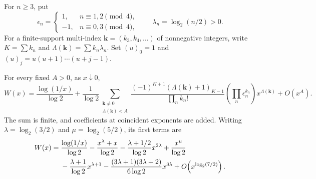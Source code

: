 For $n\ge3$, put
\begin{equation}\label{eq:lambdas}
 \epsilon_n=
 \begin{cases}1,&n\equiv1,2\pmod4,\\-1,&n\equiv0,3\pmod4,
 \end{cases}
 \qquad \lambda_n=\log_2(n/2)>0.
\end{equation}
For a finite-support multi-index $\mathbf k=(k_3,k_4,\ldots)$ of
nonnegative integers, write $K=\sum k_n$ and
$\Lambda(\mathbf k)=\sum k_n\lambda_n$. Set $(u)_0=1$ and
$(u)_j=u(u+1)\cdots(u+j-1)$.

\begin{theorem}
\label{thm:inverse}
For every fixed $A>0$, as $x\downarrow0$,
\begin{equation}\label{eq:inverseall}
 W(x)=\frac{\log(1/x)}{\log2}
 +\frac1{\log2}
 \sum_{\substack{\mathbf k\ne0\\\Lambda(\mathbf k)<A}}
 \frac{(-1)^{K+1}(\Lambda(\mathbf k)+1)_{K-1}}
      {\prod_n k_n!}
 \left(\prod_n\epsilon_n^{k_n}\right)x^{\Lambda(\mathbf k)}
 +O(x^A).
\end{equation}
The sum is finite, and coefficients at coincident exponents are added.
Writing $\lambda=\log_2(3/2)$ and $\mu=\log_2(5/2)$, its first terms are
\begin{align}\label{eq:inversefirst}
 W(x)={}&\frac{\log(1/x)}{\log2}
 -\frac{x^\lambda+x}{\log2}
 -\frac{\lambda+1/2}{\log2}x^{2\lambda}
 +\frac{x^\mu}{\log2}\notag\\
 &-\frac{\lambda+1}{\log2}x^{\lambda+1}
 -\frac{(3\lambda+1)(3\lambda+2)}{6\log2}x^{3\lambda}
 +O\!\left(x^{\log_2(7/2)}\right).
\end{align}
\end{theorem}
